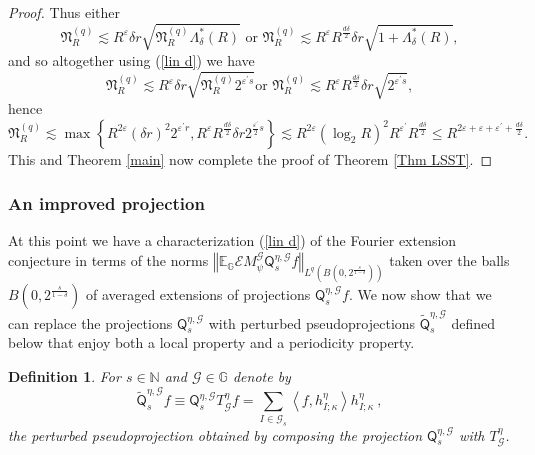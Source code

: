 \documentclass{amsart}%
\theoremstyle{plain}
\newtheorem{definition}[theorem]{Definition}
\numberwithin{equation}{section}
\begin{document}
\begin{proof}
Thus either%
\[
\mathfrak{N}_{R}^{\left(  q\right)  }\lesssim R^{\varepsilon}\delta
r\sqrt{\mathfrak{N}_{R}^{\left(  q\right)  }\Lambda_{\delta}^{\ast}\left(
R\right)  }\text{ or }\mathfrak{N}_{R}^{\left(  q\right)  }\lesssim
R^{\varepsilon}R^{\frac{d\delta}{2}}\delta r\sqrt{1+\Lambda_{\delta}^{\ast
}\left(  R\right)  },
\]
and so altogether using (\ref{lin d}) we have%
\[
\mathfrak{N}_{R}^{\left(  q\right)  }\lesssim R^{\varepsilon}\delta
r\sqrt{\mathfrak{N}_{R}^{\left(  q\right)  }2^{\varepsilon^{\prime}s}}\text{
or }\mathfrak{N}_{R}^{\left(  q\right)  }\lesssim R^{\varepsilon}%
R^{\frac{d\delta}{2}}\delta r\sqrt{2^{\varepsilon^{\prime}s}},
\]
hence%
\[
\mathfrak{N}_{R}^{\left(  q\right)  }\lesssim\max\left\{  R^{2\varepsilon
}\left(  \delta r\right)  ^{2}2^{\varepsilon^{\prime}r},R^{\varepsilon
}R^{\frac{d\delta}{2}}\delta r2^{\frac{\varepsilon^{\prime}}{2}s}\right\}
\lesssim R^{2\varepsilon}\left(  \log_{2}R\right)  ^{2}R^{\varepsilon^{\prime
}}R^{\frac{d\delta}{2}}\leq R^{2\varepsilon+\varepsilon+\varepsilon^{\prime
}+\frac{d\delta}{2}}.
\]
This and Theorem \ref{main} now complete the proof of Theorem \ref{Thm LSST}.
\end{proof}

\subsubsection{An improved projection}

At this point we have a characterization (\ref{lin d}) of the Fourier
extension conjecture in terms of the norms $\left\Vert \mathbb{E}_{\mathbb{G}%
}\mathcal{E}M_{\psi}^{\mathcal{G}}\mathsf{Q}_{s}^{\eta,\mathcal{G}%
}f\right\Vert _{L^{q}\left(  B\left(  0,2^{\frac{s}{1-\delta}}\right)
\right)  }$ taken over the balls $B\left(  0,2^{\frac{s}{1-\delta}}\right)  $
of averaged extensions of projections $\mathsf{Q}_{s}^{\eta,\mathcal{G}}f$. We
now show that we can replace the projections $\mathsf{Q}_{s}^{\eta
,\mathcal{G}}$ with perturbed pseudoprojections $\widetilde{\mathsf{Q}}%
_{s}^{\eta,\mathcal{G}}$ defined below that enjoy both a local property and a
periodicity property.

\begin{definition}
For $s\in\mathbb{N}$ and $\mathcal{G}\in\mathbb{G}$ denote by%
\[
\widetilde{\mathsf{Q}}_{s}^{\eta,\mathcal{G}}f\equiv\mathsf{Q}_{s}%
^{\eta,\mathcal{G}}T_{\mathcal{G}}^{\eta}f=\sum_{I\in\mathcal{G}_{s}%
}\left\langle f,h_{I;\kappa}^{\eta}\right\rangle h_{I;\kappa}^{\eta}\ ,
\]
the \emph{perturbed} pseudoprojection obtained by composing the projection
$\mathsf{Q}_{s}^{\eta,\mathcal{G}}$ with $T_{\mathcal{G}}^{\eta}$.
\end{definition}
\end{document}

